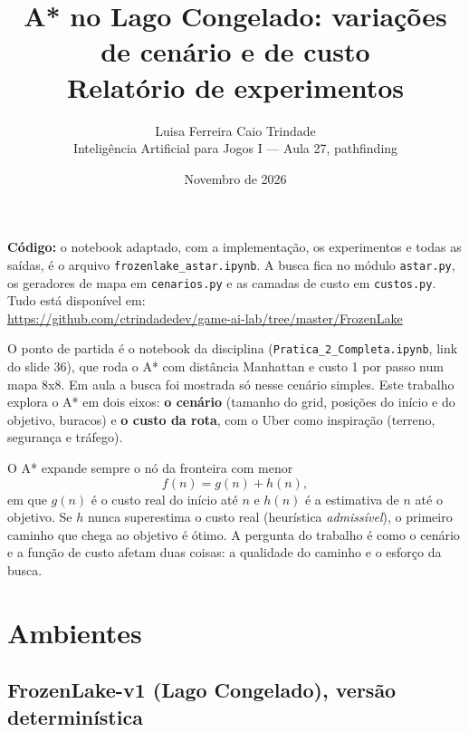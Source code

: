 \documentclass[11pt,a4paper]{article}
\title{\textbf{A* no Lago Congelado: variações de cenário e de custo}\\[0.3em]
  \large Relatório de experimentos}
\author{Luisa Ferreira \quad Caio Trindade\\
  \small Inteligência Artificial para Jogos I --- Aula 27, pathfinding}
\date{Novembro de 2026}
\begin{document}
\maketitle

\textbf{Código:} o notebook adaptado, com a implementação, os experimentos e todas as saídas, é o arquivo
\texttt{frozenlake\_astar.ipynb}. A busca fica no módulo \texttt{astar.py}, os geradores de mapa em
\texttt{cenarios.py} e as camadas de custo em \texttt{custos.py}. Tudo está disponível em:\\
\url{https://github.com/ctrindadedev/game-ai-lab/tree/master/FrozenLake}

O ponto de partida é o notebook da disciplina (\texttt{Pratica\_2\_Completa.ipynb}, link do slide 36), que roda o A*
com distância Manhattan e custo 1 por passo num mapa 8x8. Em aula a busca foi mostrada só nesse cenário simples. Este
trabalho explora o A* em dois eixos: \textbf{o cenário} (tamanho do grid, posições do início e do objetivo, buracos) e
\textbf{o custo da rota}, com o Uber como inspiração (terreno, segurança e tráfego).

O A* expande sempre o nó da fronteira com menor
\[
f(n) = g(n) + h(n),
\]
em que $g(n)$ é o custo real do início até $n$ e $h(n)$ é a estimativa de $n$ até o objetivo. Se $h$ nunca superestima
o custo real (heurística \emph{admissível}), o primeiro caminho que chega ao objetivo é ótimo. A pergunta do trabalho
é como o cenário e a função de custo afetam duas coisas: a qualidade do caminho e o esforço da busca.

\section{Ambientes}

\subsection*{FrozenLake-v1 (Lago Congelado), versão determinística}
\end{document}
